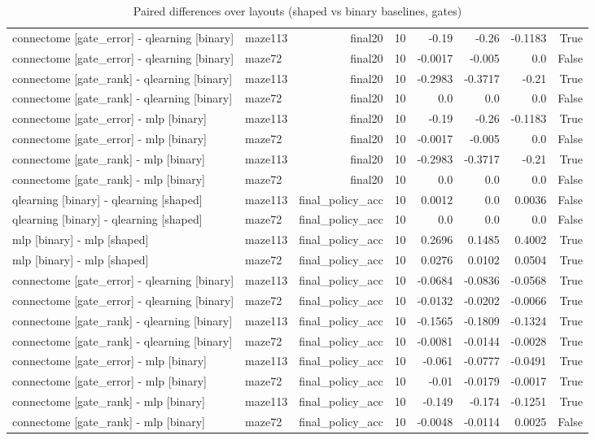 \begin{table}[t]
\begin{tabular}{llrrrrrr}
connectome [gate\_error] - qlearning [binary] & maze113 & final20 & 10 & -0.19 & -0.26 & -0.1183 & True \\
connectome [gate\_error] - qlearning [binary] & maze72 & final20 & 10 & -0.0017 & -0.005 & 0.0 & False \\
connectome [gate\_rank] - qlearning [binary] & maze113 & final20 & 10 & -0.2983 & -0.3717 & -0.21 & True \\
connectome [gate\_rank] - qlearning [binary] & maze72 & final20 & 10 & 0.0 & 0.0 & 0.0 & False \\
connectome [gate\_error] - mlp [binary] & maze113 & final20 & 10 & -0.19 & -0.26 & -0.1183 & True \\
connectome [gate\_error] - mlp [binary] & maze72 & final20 & 10 & -0.0017 & -0.005 & 0.0 & False \\
connectome [gate\_rank] - mlp [binary] & maze113 & final20 & 10 & -0.2983 & -0.3717 & -0.21 & True \\
connectome [gate\_rank] - mlp [binary] & maze72 & final20 & 10 & 0.0 & 0.0 & 0.0 & False \\
qlearning [binary] - qlearning [shaped] & maze113 & final\_policy\_acc & 10 & 0.0012 & 0.0 & 0.0036 & False \\
qlearning [binary] - qlearning [shaped] & maze72 & final\_policy\_acc & 10 & 0.0 & 0.0 & 0.0 & False \\
mlp [binary] - mlp [shaped] & maze113 & final\_policy\_acc & 10 & 0.2696 & 0.1485 & 0.4002 & True \\
mlp [binary] - mlp [shaped] & maze72 & final\_policy\_acc & 10 & 0.0276 & 0.0102 & 0.0504 & True \\
connectome [gate\_error] - qlearning [binary] & maze113 & final\_policy\_acc & 10 & -0.0684 & -0.0836 & -0.0568 & True \\
connectome [gate\_error] - qlearning [binary] & maze72 & final\_policy\_acc & 10 & -0.0132 & -0.0202 & -0.0066 & True \\
connectome [gate\_rank] - qlearning [binary] & maze113 & final\_policy\_acc & 10 & -0.1565 & -0.1809 & -0.1324 & True \\
connectome [gate\_rank] - qlearning [binary] & maze72 & final\_policy\_acc & 10 & -0.0081 & -0.0144 & -0.0028 & True \\
connectome [gate\_error] - mlp [binary] & maze113 & final\_policy\_acc & 10 & -0.061 & -0.0777 & -0.0491 & True \\
connectome [gate\_error] - mlp [binary] & maze72 & final\_policy\_acc & 10 & -0.01 & -0.0179 & -0.0017 & True \\
connectome [gate\_rank] - mlp [binary] & maze113 & final\_policy\_acc & 10 & -0.149 & -0.174 & -0.1251 & True \\
connectome [gate\_rank] - mlp [binary] & maze72 & final\_policy\_acc & 10 & -0.0048 & -0.0114 & 0.0025 & False \\
\bottomrule
\end{tabular}
\caption{Paired differences over layouts (shaped vs binary baselines, gates)}
\label{tab:layouts_binary_paired}
\end{table}